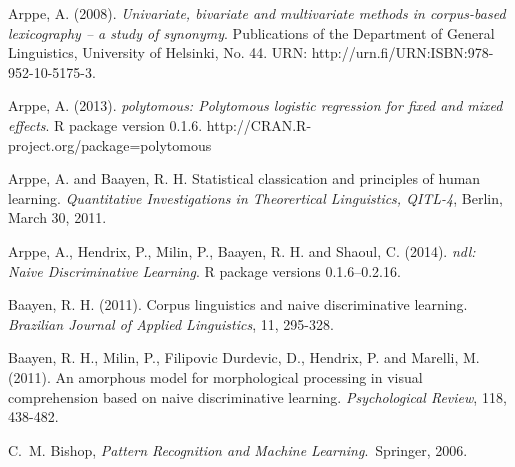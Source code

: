 \documentclass[conference]{IEEEtran}
\begin{document}

%
%
%

\begin{thebibliography}{1}


Arppe, A. (2008). \emph{Univariate, bivariate and multivariate methods in corpus-based lexicography -- a study of synonymy}. Publications of the Department of General Linguistics, University of Helsinki, No. 44. URN: http://urn.fi/URN:ISBN:978-952-10-5175-3. 

Arppe, A. (2013). \emph{polytomous: Polytomous logistic regression for fixed and mixed effects}. R
package version 0.1.6. http://CRAN.R-project.org/package=polytomous

Arppe,  A.  and  Baayen,  R.  H.  Statistical  classication  and  principles  of  human  learning. \emph{Quantitative Investigations in Theorertical Linguistics, QITL-4}, Berlin, March 30, 2011.

Arppe, A., Hendrix, P., Milin, P., Baayen, R. H. and Shaoul, C. (2014).
\emph{ndl: Naive Discriminative Learning}. R package versions 0.1.6--0.2.16.

Baayen, R. H. (2011). Corpus linguistics and naive discriminative learning. \emph{Brazilian Journal of Applied Linguistics}, 11, 295-328.

Baayen, R. H., Milin, P., Filipovic Durdevic, D., Hendrix, P. and Marelli, M. (2011). An amorphous model for morphological processing in visual comprehension based on naive discriminative learning. \emph{Psychological Review}, 118, 438-482.

C.~M. Bishop, \emph{Pattern Recognition and Machine Learning}.\ Springer, 2006.


\end{thebibliography}
\end{document}
